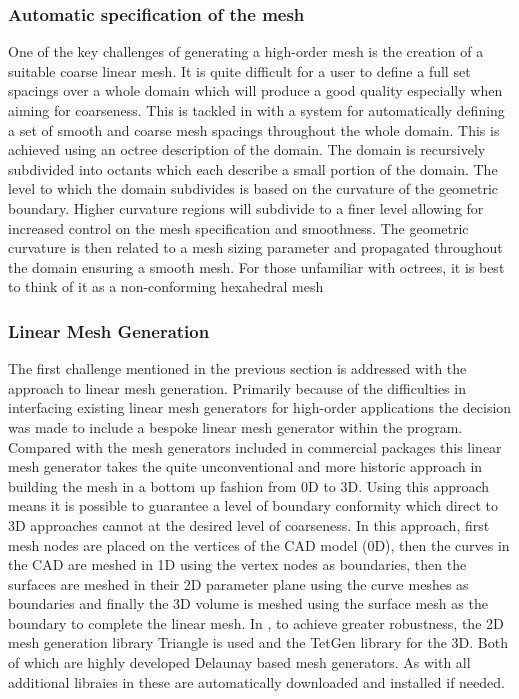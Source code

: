 \subsubsection{Automatic specification of the mesh}

One of the key challenges of generating a high-order mesh is the creation of a
suitable coarse linear mesh. It is
quite difficult for a user to define a full set spacings over a whole domain
which will produce a good quality especially when aiming for coarseness. This
is tackled in \mc with a system for automatically defining a
set of smooth and coarse mesh spacings throughout the whole domain. This is
achieved using an octree description of the domain. The domain is recursively
subdivided into octants which each describe a small portion of the domain. The
level to which the domain subdivides is based on the curvature of the geometric
boundary. Higher curvature regions will subdivide to a finer level allowing for
increased control on the mesh specification and smoothness. The geometric
curvature is then related to a mesh sizing parameter and propagated throughout
the domain ensuring a smooth mesh. For those unfamiliar with octrees, it is
best to think of it as a non-conforming hexahedral mesh

\subsubsection{Linear Mesh Generation}

The first challenge mentioned in the previous section is addressed with the
\mc approach to linear mesh generation. Primarily because of the
difficulties in interfacing existing linear mesh generators for high-order
applications the decision was made to include a bespoke linear mesh generator
within the program. Compared with the mesh generators included in commercial
packages this linear mesh generator takes the quite unconventional and more
historic approach in building the mesh in a bottom up fashion from 0D to 3D.
Using this approach means it is possible to guarantee a level of boundary
conformity which direct to 3D approaches cannot at the desired level of
coarseness. In this approach, first mesh nodes are placed on the vertices of
the CAD model (0D), then the curves in the CAD are meshed in 1D using the
vertex nodes as boundaries, then the surfaces are meshed in their 2D parameter
plane using the curve meshes as boundaries and finally the 3D volume is meshed
using the surface mesh as the boundary to complete the linear mesh. In \mc, to
achieve greater robustness, the 2D mesh generation library Triangle is used and
the TetGen library for the 3D. Both of which are highly developed Delaunay based
mesh generators. As with all additional libraies in \nekpp these are
automatically downloaded and installed if needed.

